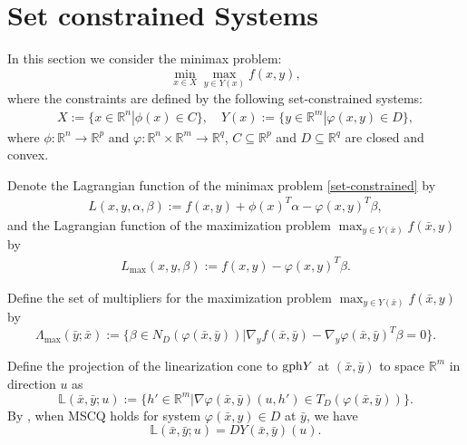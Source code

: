 \documentclass[11pt]{article}
\numberwithin{equation}{section}
\begin{document}
{\section{Set constrained Systems}\label{setconstrained}
In this section we consider the minimax problem:
\begin{equation}\label{set-constrained}
  \min_{x\in X}\max_{y\in  Y(x)} f(x,y),
  \end{equation}where  the constraints are defined by the following set-constrained systems: \begin{eqnarray*}
X:= \{ x\in \mathbb{R}^n | \phi(x)\in C\},\quad
Y(x):= \{ y\in \mathbb{R}^m | \varphi (x,y) \in D\},
\end{eqnarray*}
where  $\phi:\mathbb{R}^n \rightarrow \mathbb{R}^{p}$ and $\varphi:\mathbb{R}^n \times \mathbb{R}^m  \to \mathbb{R}^q$,  $C\subseteq \mathbb{R}^{p}$ and $D\subseteq \mathbb{R}^{q}$ are closed and convex.




Denote the Lagrangian function of the minimax problem \eqref{set-constrained} by
\begin{eqnarray*}
L(x,y,\alpha,\beta) := f(x,y) + \phi(x)^T\alpha - \varphi(x,y)^T\beta,
\end{eqnarray*}
and the Lagrangian function of the maximization problem $\max_{y\in Y(\bar x)} f(\bar x,y)$ by 
\begin{eqnarray*}
L_{\max}(x,y,\beta) := f(x,y) - \varphi(x,y)^T\beta.
\end{eqnarray*}

Define the set of multipliers for the maximization problem $\max_{y\in Y(\bar x)} f(\bar x,y)$ by
$$\Lambda_{\max}(\bar y;\bar x):=\{\beta \in N_D(\varphi(\bar x,\bar y)) |  \nabla_y f(\bar x,\bar y)-\nabla_y \varphi(\bar x,\bar y)^T\beta=0 \}.$$


Define the projection  of the linearization cone to ${\rm gph}  Y$ at $(\bar x,\bar y)$ to space $\mathbb{R}^m$ in direction $u$ as   $$\mathbb{L}(\bar x,\bar y;u) :=\{h'\in \mathbb{R}^m|\nabla \varphi(\bar x,\bar y)(u,h')\in T_D(\varphi(\bar x,\bar y))\}.$$
By \cite[Proposition 4.2]{ABM21}, when MSCQ holds for system $\varphi(\bar x,y)\in D$ at $\bar y$, we have
$$\mathbb{L}(\bar x,\bar y;u) = D Y(\bar x,\bar y)(u).$$

}
\end{document}
